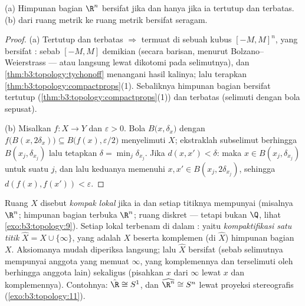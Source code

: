 \begin{corollary}
\label{cor:b3:topology:heineborel}
(a) Himpunan bagian $\R^n$ bersifat  jika dan hanya jika ia tertutup dan terbatas.
(b)  dari ruang metrik  ke ruang
metrik bersifat  seragam.
\end{corollary}

\begin{proof}
(a) Tertutup dan terbatas $\Rightarrow$ termuat di sebuah kubus
$[-M,M]^n$, yang bersifat : sebab $[-M, M]$ demikian (secara barisan, menurut
Bolzano--Weierstrass --- atau langsung lewat dikotomi pada selimutnya),
dan \cref{thm:b3:topology:tychonoff} menangani hasil kalinya; lalu
terapkan \cref{thm:b3:topology:compactprops}(1). Sebaliknya himpunan bagian
 bersifat tertutup
(\cref{thm:b3:topology:compactprops}(1)) dan terbatas (selimuti dengan
bola sepusat).

(b) Misalkan $f \colon X \to Y$ dan $\varepsilon > 0$. Bola
$B\bigl(x, \delta_x\bigr)$ dengan $f\bigl(B(x,
2\delta_x)\bigr)\subseteq B\bigl(f(x), \varepsilon/2\bigr)$
menyelimuti $X$; ekstraklah subselimut berhingga $B(x_j, \delta_{x_j})$ lalu
tetapkan $\delta = \min_j \delta_{x_j}$. Jika $d(x, x') < \delta$: maka $x
\in B(x_j, \delta_{x_j})$ untuk suatu $j$, dan lalu keduanya memenuhi $x, x'
\in B(x_j, 2\delta_{x_j})$, sehingga $d(f(x), f(x')) < \varepsilon$.
\end{proof}

\begin{definition}\label{def:b3:topology:locallycompact}
Ruang $X$ disebut \emph{kompak lokal} jika ia
 dan setiap titiknya mempunyai   (misalnya $\R^n$;
himpunan bagian terbuka $\R^n$; ruang diskret --- tetapi bukan $\Q$, lihat
\cref{exo:b3:topology:9}). Setiap  lokal terbenam di dalam
: yaitu \emph{kompaktifikasi satu
titik} $\hat X = X
\cup \{\infty\}$, yang  adalah  $X$ beserta
komplemen (di $\hat X$) himpunan bagian  $X$. Aksiomanya
mudah diperiksa langsung; lalu $\hat X$ bersifat  (sebab selimutnya mempunyai anggota
yang memuat $\infty$, yang komplemennya  dan terselimuti oleh
berhingga anggota lain) sekaligus  (pisahkan $x$ dari $\infty$
lewat   $x$ dan komplemennya). Contohnya:
$\hat\R \cong S^1$, dan $\widehat{\R^n} \cong S^n$ lewat
proyeksi stereografis (\cref{exo:b3:topology:11}).
\end{definition}

